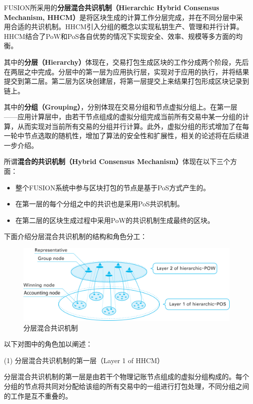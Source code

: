 \documentclass[a4paper,12pt]{article}
\begin{document}
FUSION所采用的{\bfseries 分层混合共识机制（Hierarchic Hybrid Consensus Mechanism, HHCM）}是将区块生成的计算工作分层完成，并在不同分层中采用合适的共识机制。HHCM引入分组的概念以实现私钥生产、管理和并行计算。HHCM结合了PoW和PoS各自优势的情况下实现安全、效率、规模等多方面的均衡。

其中的{\bfseries 分层（Hierarchy）}体现在，交易打包生成区块的工作分成两个阶段，先后在两层之中完成。分层中的第一层为应用执行层，实现对于应用的执行，并将结果提交到第二层。第二层为区块创建层，将第一层提交上来结果打包形成区块记录到链上。

其中的{\bfseries 分组（Grouping）}，分别体现在交易分组和节点虚拟分组上。在第一层——应用计算层中，由若干节点组成的虚拟分组完成当前所有交易中某一分组的计算，从而实现对当前所有交易的分组并行计算。此外，虚拟分组的形式增加了在每一轮中节点选取的随机性，增加了算法的安全性和扩展性，相关的论述将在后续进一步介绍。

所谓{\bfseries 混合的共识机制（Hybrid Consensus Mechanism）}体现在以下三个方面：
\begin{itemize}[itemindent=1em]
	\item 整个FUSION系统中参与区块打包的节点是基于PoS方式产生的。
	\item 在第一层的每个分组之中的共识也是采用PoS共识机制。
	\item 在第二层的区块生成过程中采用PoW的共识机制生成最终的区块。
\end{itemize}

下面介绍分层混合共识机制的结构和角色分工：

\begin{figure}[htbp]
\centering\includegraphics[width=5in]{pic/HHCA.png}
\caption{分层混合共识机制}\label{fig:1}
\end{figure}

以下对图中的角色加以阐述：

(1) 分层混合共识机制的第一层（Layer 1 of HHCM）

分层混合共识机制的第一层是由若干个物理记账节点组成的虚拟分组构成的。每个分组的节点将共同对分配给该组的所有交易中的一组进行打包处理，不同分组之间的工作是互不重叠的。
\end{document}
